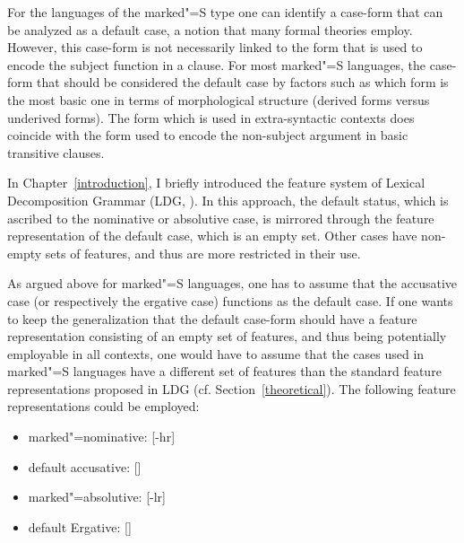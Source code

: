 For the languages of the marked"=S type one can identify a case-form that can be analyzed as a default case, a notion that many formal theories employ.
However, this case-form is not necessarily linked to the form that is used to encode the subject function in a clause. 
For most marked"=S languages, the case-form that should be considered the default case by factors such as which form is the most basic one in terms of morphological structure (derived forms versus underived forms).
The form which is used in extra-syntactic contexts does coincide with the form used to encode the non-subject argument in basic transitive clauses. 

In Chapter~\ref{introduction}, I briefly introduced the feature system of Lexical Decomposition Grammar (LDG, \citealp{Wunderlich:1997,Stiebels:2002}). 
In this approach, the default status, which is ascribed to the nominative or absolutive case, is mirrored through the feature representation of the default case, which is an empty set. Other cases have non-empty sets of features, and thus are more restricted in their use. 

As argued above for marked"=S languages, one has to assume that the accusative case (or respectively the ergative case) functions as the default case.
If one wants to keep the generalization that the default case-form should have a feature representation consisting of an empty set of features, and thus being potentially employable in all contexts, one would have to assume that the cases used in marked"=S languages have a different set of features than the  standard feature representations proposed in LDG (cf. Section~\ref{theoretical}).
The following feature representations could be employed:

\begin{itemize}
\item marked"=nominative: [-hr]
\item default accusative: [\quad]
\item marked"=absolutive: [-lr]
\item default Ergative: [\quad]
\end{itemize}

